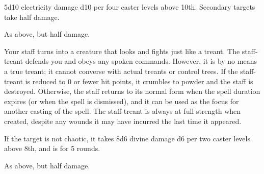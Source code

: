 \spellrng{\rngmed}
\begin{spellsuccess}
    5d10 electricity damage \add d10 per four caster levels above 10th. Secondary targets take half damage.
\end{spellsuccess}
\begin{spellfailure}
    As above, but half damage.
\end{spellfailure}

\spelldur{\durmed \dismissable}
\begin{spelleffect}
    Your staff turns into a creature that looks and fights just like a treant. The staff-treant defends you and obeys any spoken commands. However, it is by no means a true treant; it cannot converse with actual treants or control trees. If the staff-treant is reduced to 0 or fewer hit points, it crumbles to powder and the staff is destroyed. Otherwise, the staff returns to its normal form when the spell duration expires (or when the spell is dismissed), and it can be used as the focus for another casting of the spell. The staff-treant is always at full strength when created, despite any wounds it may have incurred the last time it appeared.
\end{spelleffect}

\begin{spellsuccess}
    If the target is not chaotic, it takes 8d6 divine damage \add d6 per two caster levels above 8th, and is \bewildered for 5 rounds.
\end{spellsuccess}
\begin{spellfailure}
    As above, but half damage.
\end{spellfailure}

